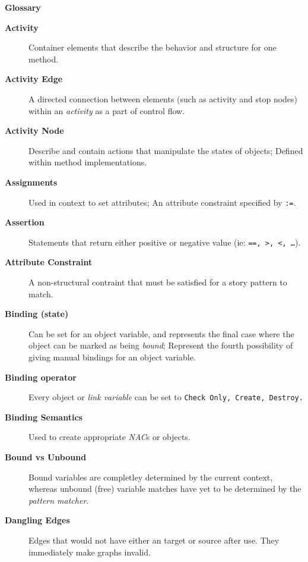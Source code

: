 \newpage
{}
{}

\vspace{1cm}
{\Huge \bf Glossary}
\vspace{1cm}

\begin{description}

\item[\bf Activity]
Container elements that describe the behavior and structure for one method.

\item[\bf Activity Edge]
A directed connection between elements (such as activity and stop nodes) within an \emph{activity} as a part of control flow.

\item[\bf Activity Node]
Describe and contain actions that manipulate the states of objects; Defined within method implementations.

\item[\bf Assignments]
Used in context to set attributes; An attribute constraint specified by \texttt{:=}.

\item[\bf Assertion]
Statements that return either positive or negative value (ie: \texttt{==, >, <, \ldots}).

\item[\bf Attribute Constraint]
A non-structural contraint that must be satisfied for a story pattern to match.

\item[\bf Binding (state)]
Can be set for an object variable, and represents the final case where the object can be marked as being \emph{bound}; Represent the fourth 
possibility of giving manual bindings for an object variable.

\item[\bf Binding operator]
Every object or \emph{link variable} can be set to \texttt{Check Only, Create, Destroy.}

\item[\bf Binding Semantics]
Used to create appropriate \emph{NAC}s or objects.

\item[\bf Bound vs Unbound]
Bound variables are completley determined by the current context, whereas unbound (free) variable matches have yet to be determined by the \emph{pattern matcher}.

\item[\bf Dangling Edges]
Edges that would not have either an target or source after use. They immediately make graphs invalid.


\end{description}
